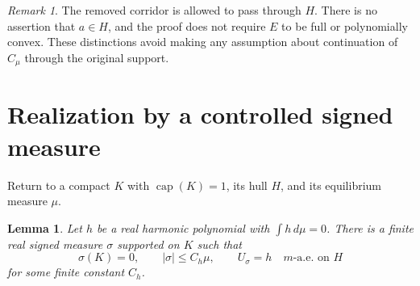 \documentclass[11pt]{article}
\DeclareMathOperator{\caplog}{cap}
\newcommand{\areaAE}{\text{a.e.}}
\newtheorem{lemma}[theorem]{Lemma}
\theoremstyle{remark}
\newtheorem{remark}[theorem]{Remark}
\numberwithin{equation}{section}
\begin{document}
\begin{remark}
The removed corridor is allowed to pass through $H$. There is no
assertion that $a\in H$, and the proof does not require $E$ to be full
or polynomially convex. These distinctions avoid making any assumption
about continuation of $C_\mu$ through the original support.
\end{remark}

\section{Realization by a controlled signed measure}
\label{sec:realization}

Return to a compact $K$ with $\caplog(K)=1$, its hull $H$, and its
equilibrium measure $\mu$.

\begin{lemma}\label{lem:realization}
Let $h$ be a real harmonic polynomial with $\int h\,d\mu=0$.
There is a finite real signed measure $\sigma$ supported on $K$ such that
\begin{equation}\label{eq:realization}
 \sigma(K)=0,\qquad |\sigma|\le C_h\mu,\qquad
 U_\sigma=h\quad m\text{-}\areaAE\text{ on }H
\end{equation}
for some finite constant $C_h$.
\end{lemma}
\end{document}
